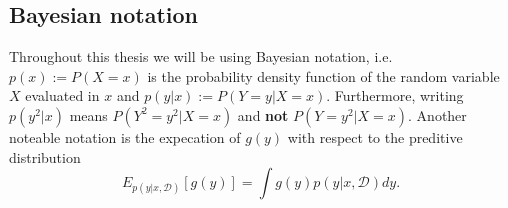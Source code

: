 \subsection{Bayesian notation}
Throughout this thesis we will be using Bayesian notation, i.e. $p(x) := P(X=x)$ is the probability
density function of the random variable $X$ evaluated in $x$ and $p(y|x) := P(Y=y|X=x)$. %
Furthermore, writing $p(y^2|x)$ means $P(Y^2=y^2|X=x)$ and \textbf{not} $P(Y=y^2|X=x)$. 
Another noteable notation is the expecation of $g(y)$ with respect to the preditive distribution 
$$E_{p(y|x,\mathcal{D})}[g(y)] = \int g(y) p(y|x,\mathcal{D}) dy.$$

